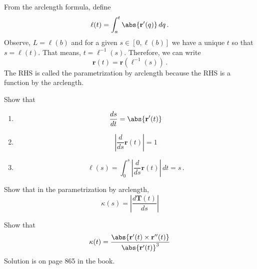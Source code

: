\documentclass[12pt]{amsart}
\begin{document}
\begin{question}
	From the arclength formula, define
	\begin{equation*}
		\ell(t) = \int_a^t \abs{\mathbf{r}'(q)} \, dq \,.
	\end{equation*}
	Observe, $L = \ell(b)$ and for a given $s \in [0 , \ell(b)]$
	we have a unique $t$ so that $s = \ell(t)$.
	That means, $t = \ell^{-1}(s)$.
	Therefore, we can write
	\begin{equation*}
		\mathbf{r}(t) = \mathbf{r}(\ell^{-1}(s)) \,.
	\end{equation*}
	The RHS is called the parametrization by arclength because the RHS is a function by the arclength.

	Show that
	\begin{enumerate}
		\item $$ \frac{ds}{dt} = \abs{\mathbf{r}'(t)} $$
		      \vspace{7cm}
		\item $$\left| \frac{ d}{ds} \mathbf{r}(t) \right| = 1$$
		      \vspace{7cm}
		\item \begin{equation*}
			      \ell(s) = \int_0^s \left| \frac{ d}{ds} \mathbf{r}(t) \right| \, dt = s\,.
		      \end{equation*}
		      \vspace{7cm}
	\end{enumerate}
\end{question}

\begin{question}
	Show that in the parametrization by arclength,
	\begin{equation*}
		\kappa(s) = \left| \frac{d \mathbf{T}(t)}{ds}  \right|
	\end{equation*}
\end{question}
\vspace{7cm}
\begin{question}
	[Hard] Show that
	\begin{equation*}
		\kappa(t) = \frac{\abs{\mathbf{r}'(t) \times \mathbf{r}''(t)}}{\abs{\mathbf{r}'(t)}^3}
	\end{equation*}
	Solution is on page 865 in the book.
\end{question}
\vspace{7cm}
\end{document}
